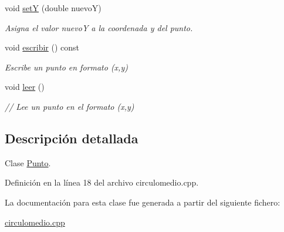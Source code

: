 \begin{DoxyCompactItemize}
\mbox{\label{classPunto_a6a0f8adb5946f31a7867a06f54d97462}} 
void \hyperlink{classPunto_a6a0f8adb5946f31a7867a06f54d97462}{setY} (double nuevoY)
\begin{DoxyCompactList}\small\item\em Asigna el valor nuevoY a la coordenada y del punto. \end{DoxyCompactList}\item 
\mbox{\label{classPunto_a05322c20e6c4f8e61aaf91f8a5d4c21a}} 
void \hyperlink{classPunto_a05322c20e6c4f8e61aaf91f8a5d4c21a}{escribir} () const
\begin{DoxyCompactList}\small\item\em Escribe un punto en formato (x,y) \end{DoxyCompactList}\item 
\mbox{\label{classPunto_a84cc9b0ee2e5b00842e7bff819b80459}} 
void \hyperlink{classPunto_a84cc9b0ee2e5b00842e7bff819b80459}{leer} ()
\begin{DoxyCompactList}\small\item\em // Lee un punto en el formato (x,y) \end{DoxyCompactList}\end{DoxyCompactItemize}


\subsection{Descripción detallada}
Clase \hyperlink{classPunto}{Punto}. 

Definición en la línea 18 del archivo circulomedio.\+cpp.



La documentación para esta clase fue generada a partir del siguiente fichero\+:\begin{DoxyCompactItemize}
\item 
\hyperlink{circulomedio_8cpp}{circulomedio.\+cpp}\end{DoxyCompactItemize}
